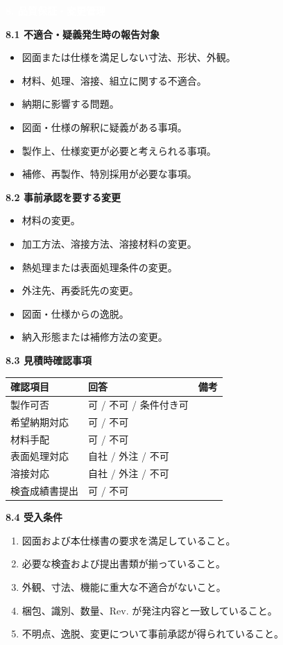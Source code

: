 \documentclass[a4paper,10pt]{ltjsarticle}
\makeatletter
\newlength{\SpecBodyWidth}
\newcommand{\PageTitle}[1]{%
  \vspace*{2mm}%
  \noindent\colorbox{SpecHead}{%
    \parbox{\dimexpr\SpecBodyWidth-2\fboxsep\relax}{%
      \large\bfseries\textcolor{white}{#1}%
    }%
  }%
  \par\vspace{5mm}%
}
\newcommand{\BlockTitle}[1]{%
  \vspace{4mm}%
  \noindent\colorbox{SpecSoft}{%
    \parbox{\dimexpr\SpecBodyWidth-2\fboxsep\relax}{%
      \normalsize\bfseries\textcolor{SpecHead}{#1}%
    }%
  }%
  \par\vspace{1.5mm}%
}
\newcommand{\Note}[1]{%
  \vspace{1.5mm}%
  \noindent\fbox{%
    \parbox{\dimexpr\SpecBodyWidth-2\fboxsep-2\fboxrule\relax}{%
      \footnotesize\textcolor{SpecMuted}{#1}%
    }%
  }%
  \par\vspace{1.5mm}%
}
\newenvironment{SpecTable}[1]{%
  \par\vspace{1mm}%
  \noindent\footnotesize%
  \renewcommand{\arraystretch}{1.10}%
  \setlength{\tabcolsep}{3.0pt}%
  \begin{tabular*}{\SpecBodyWidth}{@{\extracolsep{\fill}}#1@{}}%
}{%
  \end{tabular*}%
  \par\vspace{1.5mm}%
}
\newcommand{\Head}[1]{\textbf{\textcolor{SpecHead}{#1}}}
\makeatother
\begin{document}
\clearpage

\PageTitle{8. 品質保証・変更管理}

\BlockTitle{8.1 不適合・疑義発生時の報告対象}
\begin{itemize}
  \item 図面または仕様を満足しない寸法、形状、外観。
  \item 材料、処理、溶接、組立に関する不適合。
  \item 納期に影響する問題。
  \item 図面・仕様の解釈に疑義がある事項。
  \item 製作上、仕様変更が必要と考えられる事項。
  \item 補修、再製作、特別採用が必要な事項。
\end{itemize}
\Note{不適合品の補修、再製作、特別採用は、発注者の承認なく実施しないこと。}

\BlockTitle{8.2 事前承認を要する変更}
\begin{itemize}
  \item 材料の変更。
  \item 加工方法、溶接方法、溶接材料の変更。
  \item 熱処理または表面処理条件の変更。
  \item 外注先、再委託先の変更。
  \item 図面・仕様からの逸脱。
  \item 納入形態または補修方法の変更。
\end{itemize}

\BlockTitle{8.3 見積時確認事項}
\begin{SpecTable}{|p{48mm}|p{40mm}|p{58mm}|}
\hline
\Head{確認項目} & \Head{回答} & \Head{備考} \\
\hline
製作可否 & 可 / 不可 / 条件付き可 &  \\
\hline
希望納期対応 & 可 / 不可 &  \\
\hline
材料手配 & 可 / 不可 &  \\
\hline
表面処理対応 & 自社 / 外注 / 不可 &  \\
\hline
溶接対応 & 自社 / 外注 / 不可 &  \\
\hline
検査成績書提出 & 可 / 不可 &  \\
\hline
\end{SpecTable}

\BlockTitle{8.4 受入条件}
\begin{enumerate}
  \item 図面および本仕様書の要求を満足していること。
  \item 必要な検査および提出書類が揃っていること。
  \item 外観、寸法、機能に重大な不適合がないこと。
  \item 梱包、識別、数量、Rev. が発注内容と一致していること。
  \item 不明点、逸脱、変更について事前承認が得られていること。
\end{enumerate}
\end{document}
